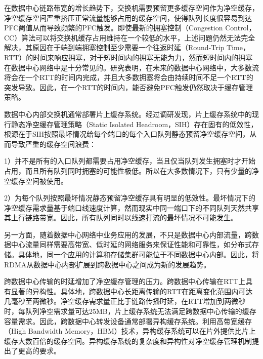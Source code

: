 在数据中心链路带宽的增长趋势下，交换机需要预留更多缓存空间作为净空缓存，净空缓存空间严重挤压正常流量能够占用的缓存空间，使得队列长度很容易到达PFC阈值从而导致频繁的PFC触发。即使最新的拥塞控制（Congestion Control，CC）算法\cite{SIGCOMM15DCQCN,SIGCOMM15TIMELY,SIGCOMM16RDMA,SIGCOMM19HPCC}可以将交换机缓存占用维持在一个较低的水平，上述问题仍然无法完全解决，其原因在于端到端拥塞控制至少需要一个往返时延（Round-Trip Time，RTT）的时间来响应拥塞，对于短时间内的拥塞无能为力，然而短时间内的拥塞在数据中心网络中是十分常见的。研究表明，在未来的数据中心网络中，大多数流将会在一个RTT的时间内完成\cite{SIGCOMM18Homa,SIGCOMM20Aeolus}，并且大多数拥塞将会由持续时间不足一个RTT的突发导致\cite{IMC17microburst}。因此，在一个RTT的时间内，能否避免PFC触发仍然取决于缓存管理策略。

数据中心内部交换机通常部署片上缓存系统。经过调研发现，片上缓存系统中的现行静态净空缓存管理策略（Static Isolated Headroom，SIH）存在固有的低效性，根源在于SIH按照最坏情况给每个端口的每个入口队列静态预留净空缓存空间，从而导致严重的缓存空间浪费：

1）并不是所有的入口队列都需要占用净空缓存，当且仅当队列发生拥塞时才开始占用，而且所有队列同时拥塞的可能性极低。所以在大多数情况下，只有少量的净空缓存空间被使用。

2）为每个队列按照最坏情况静态预留净空缓存具有明显的低效性。最坏情况下的净空缓存需求量基于端口线速度计算，然而现实中同一端口下的不同队列天然共享其上行链路带宽。因此，所有队列同时以线速打流的最坏情况不可能发生。

另一方面，随着数据中心网络中业务应用的发展，不只是数据中心内部流量，跨数据中心流量同样需要高带宽、低时延的网络服务来保证性能和可靠性\cite{bai2023empowering}，如分布式存储\cite{gao2021cloud,calder2011windows}。具体地，同一个应用的计算和存储集群可能位于不同数据中心内部。因此，将RDMA从数据中心内部扩展到跨数据中心之间成为新的发展趋势\cite{zhao2023deterministic}。

跨数据中心传输的时延增加了净空缓存管理的压力。跨数据中心传输在RTT上具有显著的异构性。具体地，跨数据中心长距离传输的RTT在距离变化范围内可达几毫秒至两微秒\cite{bai2023empowering}。净空缓存需求量正比于链路传播时延，在RTT增加到两微秒时，每队列净空需求量可达25MB，片上缓存系统无法满足跨数据中心传输的缓存容量需求。因此，跨数据中心转发设备通常部署异构缓存系统。利用高带宽缓存（High Bandwidth Memory，HBM）技术，异构缓存系统可以在片外提供比片上缓存大数百倍的缓存空间\cite{jedecHBM2E,kim2019design}。异构缓存系统的复杂度和异构性对净空缓存管理机制提出了更高的要求。



